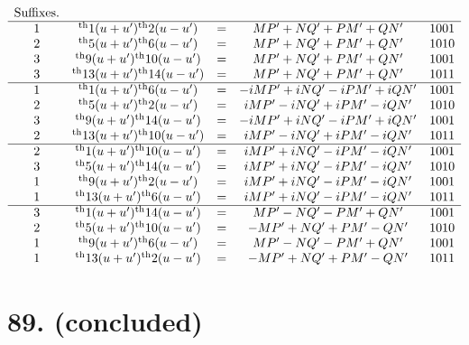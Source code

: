 \documentclass[11pt,a4paper]{book}
\providecommand{\uth}{\textsuperscript{th}}
\begin{document}
\[
\begin{array}{ccccc}
\text{Suffixes.} & & & & \\
\hline
1 & \uth{1}(u+u')\uth{2}(u-u') &=& MP' + NQ' + PM' + QN' & 1001 \\
2 & \uth{5}(u+u')\uth{6}(u-u') &=& MP' + NQ' + PM' + QN' & 1010 \\
3 & \uth{9}(u+u')\uth{10}(u-u') &=& MP' + NQ' + PM' + QN' & 1001 \\
3 & \uth{13}(u+u')\uth{14}(u-u') &=& MP' + NQ' + PM' + QN' & 1011 \\
\hline
1 & \uth{1}(u+u')\uth{6}(u-u') &=& -iMP' + iNQ' - iPM' + iQN' & 1001 \\
2 & \uth{5}(u+u')\uth{2}(u-u') &=& iMP' - iNQ' + iPM' - iQN' & 1010 \\
3 & \uth{9}(u+u')\uth{14}(u-u') &=& -iMP' + iNQ' - iPM' + iQN' & 1001 \\
2 & \uth{13}(u+u')\uth{10}(u-u') &=& iMP' - iNQ' + iPM' - iQN' & 1011 \\
\hline
2 & \uth{1}(u+u')\uth{10}(u-u') &=& iMP' + iNQ' - iPM' - iQN' & 1001 \\
3 & \uth{5}(u+u')\uth{14}(u-u') &=& iMP' + iNQ' - iPM' - iQN' & 1010 \\
1 & \uth{9}(u+u')\uth{2}(u-u') &=& iMP' + iNQ' - iPM' - iQN' & 1001 \\
1 & \uth{13}(u+u')\uth{6}(u-u') &=& iMP' + iNQ' - iPM' - iQN' & 1011 \\
\hline
3 & \uth{1}(u+u')\uth{14}(u-u') &=& MP' - NQ' - PM' + QN' & 1001 \\
2 & \uth{5}(u+u')\uth{10}(u-u') &=& -MP' + NQ' + PM' - QN' & 1010 \\
1 & \uth{9}(u+u')\uth{6}(u-u') &=& MP' - NQ' - PM' + QN' & 1001 \\
1 & \uth{13}(u+u')\uth{2}(u-u') &=& -MP' + NQ' + PM' - QN' & 1011
\end{array}
\]

\newpage
\section*{89. (concluded)}
\label{sec:89conc}
\end{document}
